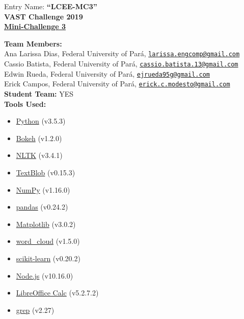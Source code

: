 \documentclass{article}
\title{}
\author{
    Entry Name: \textbf{``LCEE-MC3''}\\
    \textbf{VAST Challenge 2019}\\
    \textbf{\underline{Mini-Challenge 3}}}
\date{}
\begin{document}

\begin{center}
Entry Name: \textbf{``LCEE-MC3''}\\
\textbf{VAST Challenge 2019}\\
\textbf{\underline{Mini-Challenge 3}}
\end{center}

\noindent
\textbf{Team Members:}\\
Ana Larissa Dias, Federal University of Par\'{a}, \href{mailto:larissa.engcomp@gmail.com}  {\texttt{larissa.engcomp@gmail.com}}   \\
Cassio Batista,   Federal University of Par\'{a}, \href{mailto:cassio.batista.13@gmail.com}{\texttt{cassio.batista.13@gmail.com}} \\
Edwin Rueda,      Federal University of Par\'{a}, \href{mailto:ejrueda95g@gmail.com}       {\texttt{ejrueda95g@gmail.com}}        \\
Erick Campos,     Federal University of Par\'{a}, \href{mailto:erick.c.modesto@gmail.com}  {\texttt{erick.c.modesto@gmail.com}}   \\

\noindent
\textbf{Student Team:} YES \\

\noindent
\textbf{Tools Used:}
\begin{itemize}
    \item \href{https://www.python.org/downloads/}               {Python}           (v3.5.3)
    \item \href{https://bokeh.pydata.org/en/latest/}             {Bokeh}            (v1.2.0)
    \item \href{https://www.nltk.org/}                           {NLTK}             (v3.4.1)
    \item \href{https://textblob.readthedocs.io/}                {TextBlob}         (v0.15.3)
    \item \href{https://www.numpy.org/}                          {NumPy}            (v1.16.0)
    \item \href{https://pandas.pydata.org/}                      {pandas}           (v0.24.2)
    \item \href{https://matplotlib.org/}                         {Matplotlib}       (v3.0.2)
    \item \href{https://github.com/amueller/word_cloud}          {word\_cloud}      (v1.5.0)
    \item \href{https://scikit-learn.org/stable/}                {scikit-learn}     (v0.20.2)
    \item \href{https://nodejs.org/en/download/}                 {Node.js}          (v10.16.0)
    \item \href{https://www.libreoffice.org/}                    {LibreOffice Calc} (v5.2.7.2)
    \item \href{http://man7.org/linux/man-pages/man1/grep.1.html}{grep}             (v2.27)
\end{itemize}
\end{document}
